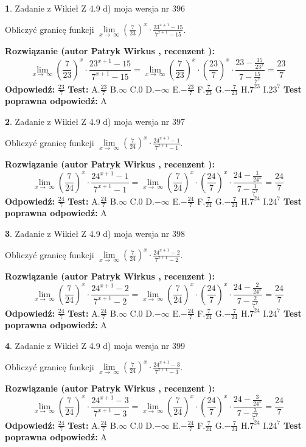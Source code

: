 \documentclass[12pt, a4paper]{article}
\theoremstyle{definition} %
\newtheorem{zad}{}
\newcommand{\zadStart}[1]{\begin{zad}#1\newline}
\newcommand{\zadStop}{\end{zad}}
\newcommand{\rozwStart}[2]{\noindent \textbf{Rozwiązanie (autor #1 , recenzent #2): }\newline}
\newcommand{\rozwStop}{\newline}
\newcommand{\odpStart}{\noindent \textbf{Odpowiedź:}\newline}
\newcommand{\odpStop}{\newline}
\newcommand{\testStart}{\noindent \textbf{Test:}\newline}
\newcommand{\testStop}{\newline}
\newcommand{\kluczStart}{\noindent \textbf{Test poprawna odpowiedź:}\newline}
\newcommand{\kluczStop}{\newline}
\begin{document}
\zadStart{Zadanie z Wikieł Z 4.9 d) moja wersja nr 396}


Obliczyć granicę funkcji  $\lim\limits_{x\to\ \infty}(\frac{7}{23})^{x}\cdot\frac{23^{x+1}-15}{7^{x+1}-15}$.
\zadStop
\rozwStart{Patryk Wirkus}{}
$$\lim\limits_{x\to\ \infty}(\frac{7}{23})^{x}\cdot\frac{23^{x+1}-15}{7^{x+1}-15}=\lim\limits_{x\to\ \infty}(\frac{7}{23})^{x}\cdot(\frac{23}{7})^{x} \cdot \frac{23-\frac{15}{23^{x}}}{7-\frac{15}{7^{x}}} = \frac{23}{7}$$
\rozwStop
\odpStart
$\frac{23}{7}$
\odpStop
\testStart
A.$\frac{23}{7}$ B.$\infty$ C.$0$ D.$-\infty$ E.$-\frac{23}{7}$
F.$\frac{7}{23}$ G.$-\frac{7}{23}$
H.$7^{23}$
I.$23^{7}$
\testStop
\kluczStart
A
\kluczStop



\zadStart{Zadanie z Wikieł Z 4.9 d) moja wersja nr 397}


Obliczyć granicę funkcji  $\lim\limits_{x\to\ \infty}(\frac{7}{24})^{x}\cdot\frac{24^{x+1}-1}{7^{x+1}-1}$.
\zadStop
\rozwStart{Patryk Wirkus}{}
$$\lim\limits_{x\to\ \infty}(\frac{7}{24})^{x}\cdot\frac{24^{x+1}-1}{7^{x+1}-1}=\lim\limits_{x\to\ \infty}(\frac{7}{24})^{x}\cdot(\frac{24}{7})^{x} \cdot \frac{24-\frac{1}{24^{x}}}{7-\frac{1}{7^{x}}} = \frac{24}{7}$$
\rozwStop
\odpStart
$\frac{24}{7}$
\odpStop
\testStart
A.$\frac{24}{7}$ B.$\infty$ C.$0$ D.$-\infty$ E.$-\frac{24}{7}$
F.$\frac{7}{24}$ G.$-\frac{7}{24}$
H.$7^{24}$
I.$24^{7}$
\testStop
\kluczStart
A
\kluczStop



\zadStart{Zadanie z Wikieł Z 4.9 d) moja wersja nr 398}


Obliczyć granicę funkcji  $\lim\limits_{x\to\ \infty}(\frac{7}{24})^{x}\cdot\frac{24^{x+1}-2}{7^{x+1}-2}$.
\zadStop
\rozwStart{Patryk Wirkus}{}
$$\lim\limits_{x\to\ \infty}(\frac{7}{24})^{x}\cdot\frac{24^{x+1}-2}{7^{x+1}-2}=\lim\limits_{x\to\ \infty}(\frac{7}{24})^{x}\cdot(\frac{24}{7})^{x} \cdot \frac{24-\frac{2}{24^{x}}}{7-\frac{2}{7^{x}}} = \frac{24}{7}$$
\rozwStop
\odpStart
$\frac{24}{7}$
\odpStop
\testStart
A.$\frac{24}{7}$ B.$\infty$ C.$0$ D.$-\infty$ E.$-\frac{24}{7}$
F.$\frac{7}{24}$ G.$-\frac{7}{24}$
H.$7^{24}$
I.$24^{7}$
\testStop
\kluczStart
A
\kluczStop



\zadStart{Zadanie z Wikieł Z 4.9 d) moja wersja nr 399}


Obliczyć granicę funkcji  $\lim\limits_{x\to\ \infty}(\frac{7}{24})^{x}\cdot\frac{24^{x+1}-3}{7^{x+1}-3}$.
\zadStop
\rozwStart{Patryk Wirkus}{}
$$\lim\limits_{x\to\ \infty}(\frac{7}{24})^{x}\cdot\frac{24^{x+1}-3}{7^{x+1}-3}=\lim\limits_{x\to\ \infty}(\frac{7}{24})^{x}\cdot(\frac{24}{7})^{x} \cdot \frac{24-\frac{3}{24^{x}}}{7-\frac{3}{7^{x}}} = \frac{24}{7}$$
\rozwStop
\odpStart
$\frac{24}{7}$
\odpStop
\testStart
A.$\frac{24}{7}$ B.$\infty$ C.$0$ D.$-\infty$ E.$-\frac{24}{7}$
F.$\frac{7}{24}$ G.$-\frac{7}{24}$
H.$7^{24}$
I.$24^{7}$
\testStop
\kluczStart
A
\kluczStop
\end{document}
